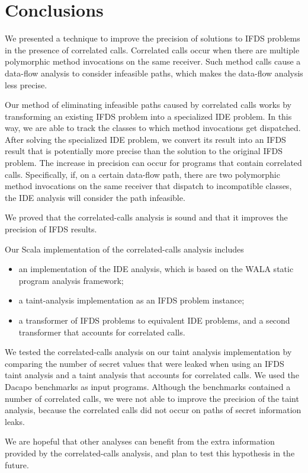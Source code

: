 \section{Conclusions}
  \label{sec:Conclusions}
We presented a technique to improve the precision of solutions to IFDS problems in the presence of correlated calls. Correlated calls occur when there are multiple polymorphic method invocations on the same receiver. Such method calls cause a data-flow analysis to consider infeasible paths, which makes the data-flow analysis less precise.

Our method of eliminating infeasible paths caused by correlated calls works by transforming an existing IFDS problem into a specialized IDE problem. In this way, we are able to track the classes to which method invocations get dispatched. After solving the specialized IDE problem, we convert its result into an IFDS result that is potentially more precise than the solution to the original IFDS problem. The increase in precision can occur for programs that contain correlated calls. Specifically, if, on a certain data-flow path, there are two polymorphic method invocations on the same receiver that dispatch to incompatible classes, the IDE analysis will consider the path infeasible.

We proved that the correlated-calls analysis is sound and that it improves the precision of IFDS results.

Our Scala implementation of the correlated-calls analysis includes
\begin{itemize}
  \item an implementation of the IDE analysis, which is based on the WALA static program analysis framework;
  \item a taint-analysis implementation as an IFDS problem instance;
  \item a transformer of IFDS problems to equivalent IDE problems, and a second transformer that accounts for correlated calls.
\end{itemize}

We tested the correlated-calls analysis on our taint analysis implementation by comparing the number of secret values that were leaked when using an IFDS taint analysis and a taint analysis that accounts for correlated calls. We used the Dacapo benchmarks as input programs. Although the benchmarks contained a number of correlated calls, we were not able to improve the precision of the taint analysis, because the correlated calls did not occur on paths of secret information leaks.

We are hopeful that other analyses can benefit from the extra information provided by the correlated-calls analysis, and plan to test this hypothesis in the future.
